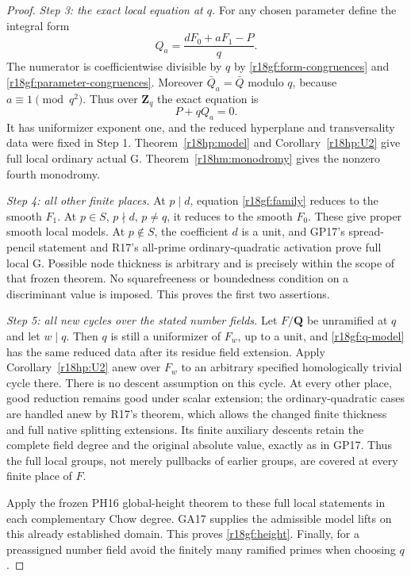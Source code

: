 \begin{proof}
\emph{Step 3: the exact local equation at $q$.}
For any chosen parameter define the integral form
\[
                         Q_a=\frac{dF_0+aF_1-P}{q}.
 \tag{GF18.5}\label{r18gf:Qa}
\]
The numerator is coefficientwise divisible by $q$ by
\eqref{r18gf:form-congruences} and
\eqref{r18gf:parameter-congruences}.  Moreover
$\bar Q_a=\bar Q$ modulo $q$, because $a\equiv1\pmod{q^2}$.
Thus over $\mathbf Z_q$ the exact equation is
\[
                              P+qQ_a=0.
 \tag{GF18.6}\label{r18gf:q-model}
\]
It has uniformizer exponent one, and the reduced hyperplane and
transversality data were fixed in Step 1.  Theorem~\ref{r18hp:model}
and Corollary~\ref{r18hp:U2} give full local ordinary actual G.
Theorem~\ref{r18hm:monodromy} gives the nonzero fourth monodromy.

\emph{Step 4: all other finite places.}
At $p\mid d$, equation \eqref{r18gf:family} reduces to the
smooth $F_1$.  At $p\in S$, $p\nmid d$, $p\ne q$, it reduces
to the smooth $F_0$.  These give proper smooth local models.
At $p\notin S$, the coefficient $d$ is a unit, and GP17's
spread-pencil statement and R17's all-prime ordinary-quadratic
activation prove full local G.  Possible node thickness is arbitrary
and is precisely within the scope of that frozen theorem.
No squarefreeness or boundedness condition on a discriminant value
is imposed.  This proves the first two assertions.

\emph{Step 5: all new cycles over the stated number fields.}
Let $F/\mathbf Q$ be unramified at $q$ and let $w\mid q$.
Then $q$ is still a uniformizer of $F_w$, up to a unit, and
\eqref{r18gf:q-model} has the same reduced data after its residue
field extension.  Apply Corollary~\ref{r18hp:U2} anew over $F_w$
to an arbitrary specified homologically trivial cycle there.
There is no descent assumption on this cycle.  At every other
place, good reduction remains good under scalar extension;
the ordinary-quadratic cases are handled anew by R17's theorem,
which allows the changed finite thickness and full native splitting
extensions.  Its finite auxiliary descents retain the complete
field degree and the original absolute value, exactly as in GP17.
Thus the full local groups, not merely pullbacks of earlier groups,
are covered at every finite place of $F$.

Apply the frozen PH16 global-height theorem to these full local
statements in each complementary Chow degree.  GA17 supplies the
admissible model lifts on this already established domain.  This
proves \eqref{r18gf:height}.  Finally, for a preassigned number
field avoid the finitely many ramified primes when choosing $q$.
\end{proof}

